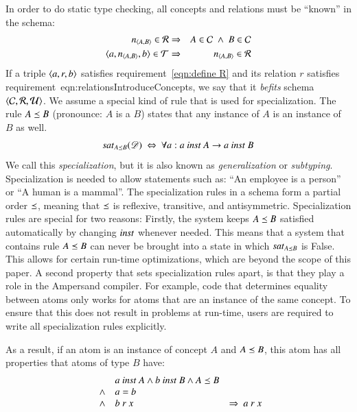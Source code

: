 \documentclass{elsarticle}
\begin{document}
   In order to do static type checking,
   all concepts and relations must be ``known'' in the schema:
\begin{eqnarray}
   \declare{n}{A}{B}\in\rels&\Rightarrow&A\in\concepts\ \wedge\ B\in\concepts
   \label{eqn:relationsIntroduceConcepts}\\
   \triple{a}{\declare{n}{A}{B}}{b}\in\triples&\Rightarrow&\declare{n}{A}{B}\in\rels
   \label{eqn:define R}
\end{eqnarray}
   If a triple $\langle{a},{r},{b}\rangle$ satisfies requirement~\ref{eqn:define R} and its relation $r$ satisfies requirement~{eqn:relationsIntroduceConcepts},
   we say that it {\em befits} schema $\langle{\mathcal{C}},{\mathcal{R}},{\mathcal{U}}\rangle$.
   We assume a special kind of rule that is used for specialization.
   The rule $A\preceq B$ (pronounce: $A$ is a $B$) states that any instance of $A$ is an instance of $B$ as well.
\begin{equation}
   \label{eqn:specialization}
   \sat{A\isa B}{\dataset}\ \Leftrightarrow\ \forall a: a\ \inst\ A\rightarrow a\ \inst\ B
\end{equation}
   We call this {\em specialization}, but it is also known as {\em generalization} or {\em subtyping}.
   Specialization is needed to allow statements such as: ``An employee is a person'' or ``A human is a mammal''.
   The specialization rules in a schema form a partial order $\preceq$,
   meaning that $\preceq$ is reflexive, transitive, and antisymmetric.
   Specialization rules are special for two reasons:
   Firstly, the system keeps $A\preceq B$ satisfied automatically by changing $\text{\it inst\/}$ whenever needed.
   This means that a system that contains rule $A\preceq B$ can never be brought into a state in which $\text{\it sat\/}_{A\preceq B}$ is False.
   This allows for certain run-time optimizations, which are beyond the scope of this paper.
   A second property that sets specialization rules apart, is that they play a role in the Ampersand compiler.
   For example, code that determines equality between atoms only works for atoms that are an instance of the same concept.
   To ensure that this does not result in problems at run-time, users are required to write all specialization rules explicitly.

   As a result, if an atom is an instance of concept $A$ and $A\preceq B$,
   this atom has all properties that atoms of type $B$ have:
\begin{equation}
   \begin{array}[b]{ll}
      &a\ \text{\it inst\/}\ A\wedge b\ \text{\it inst\/}\ B\wedge A\preceq B\\
      \wedge&a=b\\
      \wedge&b\ r\ x
   \end{array}
      \ \Rightarrow\ a\ r\ x
\end{equation}
\end{document}
